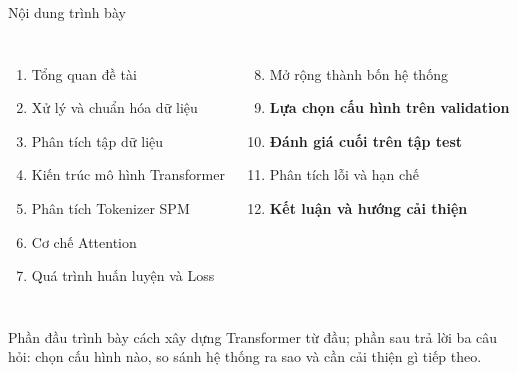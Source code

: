 \documentclass[aspectratio=169,10pt]{beamer}
\begin{document}
\begin{frame}{Nội dung trình bày}
  \vspace{0.18cm}
  \begin{columns}[T,onlytextwidth]
      \begin{enumerate}
        \setlength{\itemsep}{5pt}
        \item Tổng quan đề tài
        \item Xử lý và chuẩn hóa dữ liệu
        \item Phân tích tập dữ liệu
        \item Kiến trúc mô hình Transformer
        \item Phân tích Tokenizer SPM
        \item Cơ chế Attention
        \item Quá trình huấn luyện và Loss
      \end{enumerate}
      \begin{enumerate}
        \setcounter{enumi}{7}
        \setlength{\itemsep}{5pt}
        \item Mở rộng thành bốn hệ thống
        \item \textbf{Lựa chọn cấu hình trên validation}
        \item \textbf{Đánh giá cuối trên tập test}
        \item Phân tích lỗi và hạn chế
        \item \textbf{Kết luận và hướng cải thiện}
      \end{enumerate}
  \end{columns}
  \vfill
  \begin{keymessage}
    Phần đầu trình bày cách xây dựng Transformer từ đầu; phần sau trả lời ba câu hỏi: chọn cấu hình nào, so sánh hệ thống ra sao và cần cải thiện gì tiếp theo.
  \end{keymessage}
\end{frame}
\end{document}
